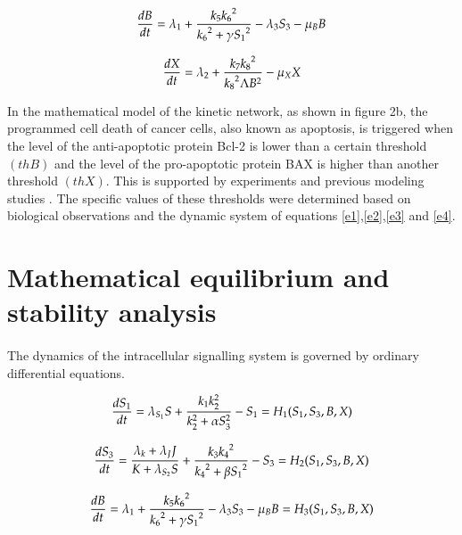 \begin{equation}
\label{e3}
\frac{dB}{dt} = \lambda_1+ \frac{k_5{k_6}^2}{{k_6}^2+\gamma{S_1}^2} -  \lambda_3 S_3 - \mu_BB \\
\end{equation}

\begin{equation}
\label{e4}
    \frac{dX}{dt}= \lambda_2+ \frac{k_7{k_8}^2}{{k_8}^2\Lambda B^2} -\mu_XX \\
\end{equation}

In the mathematical model of the kinetic network, as shown in figure 2b, the programmed cell death of cancer cells, also known as apoptosis, is triggered when the level of the anti-apoptotic protein Bcl-2 is lower than a certain threshold $(thB)$ and the level of the pro-apoptotic protein BAX is higher than another threshold $(thX)$. This is supported by experiments and previous modeling studies \cite{kim2019synergistic,bagci2006bistability,gaudette2016low}. The specific values of these thresholds were determined based on biological observations and the dynamic system of equations \eqref{e1},\eqref{e2},\eqref{e3} and \eqref{e4}.



\newpage

\section{Mathematical equilibrium and stability analysis}
\paragraph{}

The dynamics of the intracellular signalling system is governed by ordinary differential equations. 


\begin{equation}
\label{Q1}
     \frac{dS_1}{dt} = \lambda_{S_1} S + \frac{ k_1k_2^2} {k_2^2+\alpha S_3^2} - S_1  = H_1(S_1,S_3,B,X) \\
\end{equation}

\begin{equation}
\label{Q2}
\frac{dS_3}{dt} = \frac{\lambda_k+\lambda_JJ} {K+ \lambda_{S_2} S} +\frac{k_3{k_4}^2}{{k_4}^2+\beta{S_1}^2}-S_3  = H_2(S_1,S_3,B,X)\\
\end{equation}


\begin{equation}
\label{Q3}
\frac{dB}{dt} = \lambda_1+ \frac{k_5{k_6}^2}{{k_6}^2+\gamma{S_1}^2} -  \lambda_3 S_3 - \mu_BB = H_3(S_1,S_3,B,X)  \\
\end{equation}

